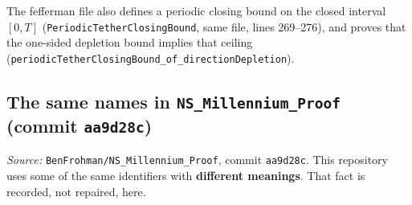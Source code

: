 \documentclass[11pt]{article}
\theoremstyle{plain}
\theoremstyle{definition}
\theoremstyle{remark}
\begin{document}
The fefferman file also defines a periodic closing bound on the closed interval \([0,T]\) (\texttt{PeriodicTetherClosingBound}, same file, lines 269--276), and proves that the one-sided depletion bound implies that ceiling (\texttt{periodicTetherClosingBound\_\hspace{0pt}of\_\hspace{0pt}directionDepletion}).

\subsection[The same names in NS\_Millennium\_Proof (commit aa9d28c)]{The same names in \texttt{NS\_Millennium\_Proof} (commit \texttt{aa9d28c})}

\textit{Source:} \texttt{BenFrohman/\hspace{0pt}NS\_\hspace{0pt}Millennium\_\hspace{0pt}Proof}, commit \texttt{aa9d28c}. This repository uses some of the same identifiers with \textbf{different meanings}. That fact is recorded, not repaired, here.
\end{document}
